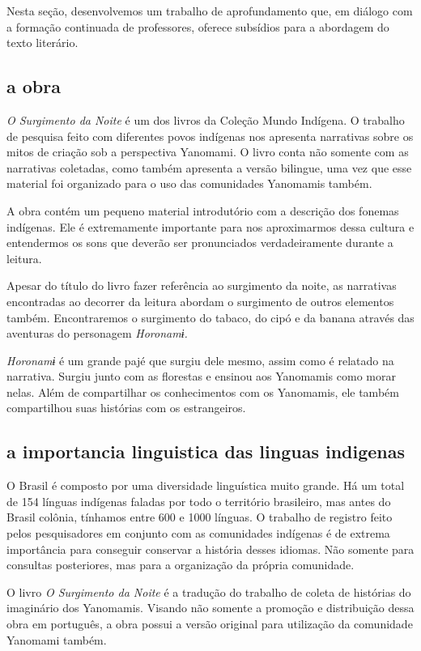 \documentclass[12pt]{extarticle}
\begin{document}
Nesta seção, desenvolvemos um trabalho de aprofundamento que, em diálogo
com a formação continuada de professores, oferece subsídios para a
abordagem do texto literário.

\subsection{a obra}

\emph{O Surgimento da Noite} é um dos livros da Coleção Mundo Indígena.
O trabalho de pesquisa feito com diferentes povos indígenas nos
apresenta narrativas sobre os mitos de criação sob a perspectiva
Yanomami. O livro conta não somente com as narrativas coletadas, como
também apresenta a versão bilingue, uma vez que esse material foi
organizado para o uso das comunidades Yanomamis também.

A obra contém um pequeno material introdutório com a descrição dos
fonemas indígenas. Ele é extremamente importante para nos aproximarmos
dessa cultura e entendermos os sons que deverão ser pronunciados
verdadeiramente durante a leitura.

Apesar do título do livro fazer referência ao surgimento da noite, as
narrativas encontradas ao decorrer da leitura abordam o surgimento de
outros elementos também. Encontraremos o surgimento do tabaco, do cipó e
da banana através das aventuras do personagem \emph{Horonamɨ.}

\emph{Horonamɨ} é um grande pajé que surgiu dele mesmo, assim como é
relatado na narrativa. Surgiu junto com as florestas e ensinou aos
Yanomamis como morar nelas. Além de compartilhar os conhecimentos com os
Yanomamis, ele também compartilhou suas histórias com os estrangeiros.

\subsection{a importancia linguistica das linguas indigenas }

O Brasil é composto por uma diversidade linguística muito grande. Há um
total de 154 línguas indígenas faladas por todo o território brasileiro,
mas antes do Brasil colônia, tínhamos entre 600 e 1000 línguas. O
trabalho de registro feito pelos pesquisadores em conjunto com as
comunidades indígenas é de extrema importância para conseguir conservar
a história desses idiomas. Não somente para consultas posteriores, mas
para a organização da própria comunidade.

O livro \emph{O Surgimento da Noite} é a tradução do trabalho de coleta
de histórias do imaginário dos Yanomamis. Visando não somente a promoção
e distribuição dessa obra em português, a obra possui a versão original
para utilização da comunidade Yanomami também.
\end{document}
